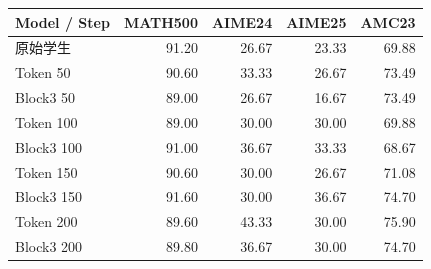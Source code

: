 \begin{tabular}{lrrrr}
\toprule
Model / Step & MATH500 & AIME24 & AIME25 & AMC23 \\
\midrule
原始学生 & 91.20 & 26.67 & 23.33 & 69.88 \\
Token 50 & 90.60 & 33.33 & 26.67 & 73.49 \\
Block3 50 & 89.00 & 26.67 & 16.67 & 73.49 \\
Token 100 & 89.00 & 30.00 & 30.00 & 69.88 \\
Block3 100 & 91.00 & 36.67 & 33.33 & 68.67 \\
Token 150 & 90.60 & 30.00 & 26.67 & 71.08 \\
Block3 150 & 91.60 & 30.00 & 36.67 & 74.70 \\
Token 200 & 89.60 & 43.33 & 30.00 & 75.90 \\
Block3 200 & 89.80 & 36.67 & 30.00 & 74.70 \\
\bottomrule
\end{tabular}
